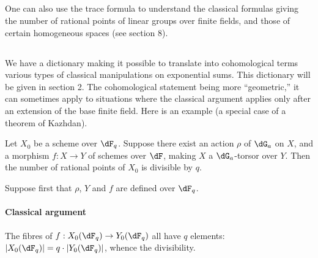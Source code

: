 \subsection{}\label{VI:1-11}

One can also use the trace formula to understand the classical
formulas giving the number of rational points of linear groups over
finite fields, and those of certain homogeneous spaces (see section
8). 





\subsection{}\label{VI:1-12}

We have a dictionary making it possible to translate into cohomological terms
various types of classical manipulations on exponential
sums. This dictionary will be given in section 2. The
cohomological statement being more ``geometric,'' it can sometimes apply
to situations where the classical argument applies only after an
extension of the base finite field. Here is an example (a special case of a
theorem of Kazhdan). 





\begin{theorem_}[Kazhdan]\label{VI:1-13}
Let $X_0$ be a scheme over $\dF_q$. Suppose there exist an action $\rho$ of
$\dG_a$ on $X$, and a morphism $f:X\to Y$ of schemes over $\dF$, making
$X$ a $\dG_a$-torsor over $Y$. Then the number of rational points of $X_0$
is divisible by $q$.
\end{theorem_}

Suppose first that $\rho$, $Y$ and $f$ are defined over $\dF_q$.


\paragraph{Classical argument}
The fibres of $f:X_0(\dF_q)\to Y_0(\dF_q)$ all have $q$ elements:
$|X_0(\dF_q)| = q\cdot |Y_0(\dF_q)|$, whence the divisibility.


